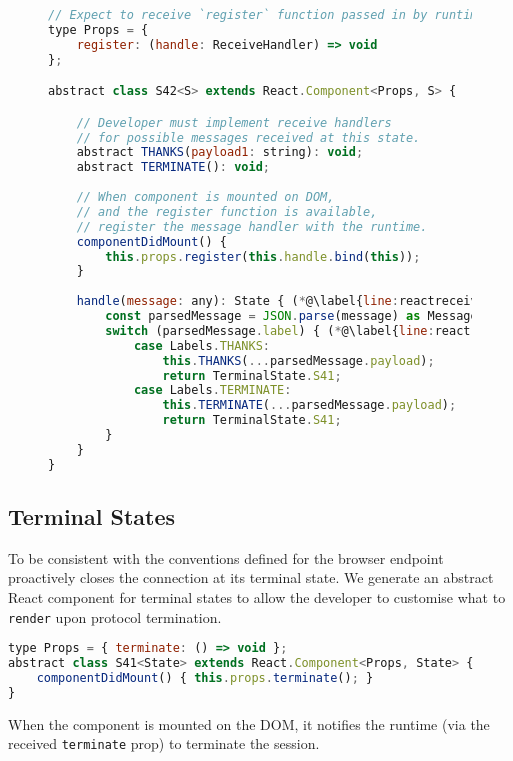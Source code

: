 \begin{figure}[!h]
\begin{lstlisting}[language=javascript,tabsize=2]
// Expect to receive `register` function passed in by runtime
type Props = {
	register: (handle: ReceiveHandler) => void
};

abstract class S42<S> extends React.Component<Props, S> {

	// Developer must implement receive handlers
	// for possible messages received at this state.
	abstract THANKS(payload1: string): void;
	abstract TERMINATE(): void;
	
	// When component is mounted on DOM,
	// and the register function is available,
	// register the message handler with the runtime.
	componentDidMount() {
		this.props.register(this.handle.bind(this));
	}
	
	handle(message: any): State { (*@\label{line:reactreceivehandle}@*)
		const parsedMessage = JSON.parse(message) as Message;
		switch (parsedMessage.label) { (*@\label{line:reactreceivediscriminate}@*)
			case Labels.THANKS:
				this.THANKS(...parsedMessage.payload);
				return TerminalState.S41;
			case Labels.TERMINATE:
				this.TERMINATE(...parsedMessage.payload);
				return TerminalState.S41;
		}
	}
}
\end{lstlisting}
\label{lst:reactreceivecomponent}
\end{figure}

\subsection{Terminal States}
To be consistent with the conventions defined for \nodecodegen
the browser endpoint proactively closes the connection at its terminal state.
We generate an abstract React component for terminal states 
to allow the developer to customise what to
\texttt{render} upon protocol termination.

\begin{lstlisting}[language=javascript]
type Props = { terminate: () => void };
abstract class S41<State> extends React.Component<Props, State> {
	componentDidMount() { this.props.terminate(); }	
}
\end{lstlisting}

When the component is mounted on the DOM, it notifies the runtime
(via the received \texttt{terminate} prop) to terminate the session.